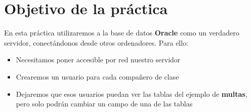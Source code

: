 
\usepackage{eurosym}





\renewcommand{\hmwkTitle}{Conexión remota con \textbf{SQLDeveloper}}


\usepackage{blindtext}






\primerapagina

\setlength{\parindent}{2em}
\setlength{\parskip}{1em}

\section{Objetivo de la práctica}
En esta práctica utilizaremos a la base de datos \textbf{Oracle} como un verdadero servidor, conectándonos desde otros ordenadores. Para ello:
\begin{itemize}
\item Necesitamos poner accesible por red nuestro servidor
\item Crearemos un usuario para cada compañero de clase
\item Dejaremos que esos usuarios puedan ver las tablas del ejemplo de \textbf{multas}, pero solo podrán cambiar un campo de una de las tablas
\end{itemize}

